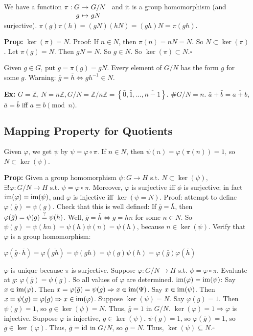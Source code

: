 \documentclass[10pt,letterpaper]{article}
\newcommand{\n}{\hfill\break}
\newcommand{\hangblock}[2]{\par\noindent\settowidth{\hangindent}{\textbf{#1: }}\textbf{#1: }\!\!\!#2}
\newcommand{\prop}[1]{\hangblock{Prop}{#1}}
\newcommand{\ex}[1]{\hangblock{Ex}{#1}}
\newcommand{\proven}{\;$\square$\n}
\newcommand{\ptxt}[1]{\textrm{\textnormal{#1}}}
\newcommand{\inlineeq}[1]{\centerline{$\displaystyle #1$}}
\newcommand{\set}[1]{\left\{#1\right\}}
\newcommand{\integers}{\mathbb{Z}}
\newcommand{\Z}{\integers}
\newcommand{\inv}{^{-1}}
\newcommand{\of}{\circ}
\newcommand{\map}[4]{\!\!\!\begin{array}[t]{rcl}#1 & \!\!\!\!\to & \!\!\!\!#2\\ #3 & \!\!\!\!\mapsto & \!\!\!\!#4\end{array}}
\newcommand{\im}{\textrm{\textnormal{im}}}
\newcommand{\id}{\ptxt{id}}
\newcommand{\st}{s.t.}
\newcommand{\unique}{!}
\begin{document}
\par\noindent
We have a function $\map{\pi:G}{G/N}{g}{gN}$ and it is a group homomorphism (and surjective).\n
$\pi(g)\pi(h)=(gN)(hN)=(gh)N=\pi(gh)$.\n

\prop{
	$\ker(\pi)=N$.\n
	Proof: If $n\in{}N$, then $\pi(n)=nN=N$. So $N\subset\ker(\pi)$.\n
	Let $\pi(g)=N$. Then $gN=N$. So $g\in{}N$. So $\ker(\pi)\subset{}N$.\proven
}

\par\noindent
Given $g\in{}G$, put $\bar{g}=\pi(g)=gN$. Every element of $G/N$ has the form $\bar{g}$ for some $g$.\n
Warning: $\bar{g}=\bar{h}\Leftrightarrow{}gh\inv\in{}N$.\n

\ex{
	$G=\Z$, $N=n\Z,G/N=\Z/n\Z=\set{\bar{0},\bar{1},\ldots,\overline{n-1}}$.\n
	$\#G/N=n$. $\bar{a}+\bar{b}=\overline{a+b}$, $\bar{a}=\bar{b}$ iff $a\equiv{}b\pmod{n}$.\n
}

\subsection*{Mapping Property for Quotients}

Given $\varphi$, we get $\psi$ by $\psi=\varphi\of\pi$. If $n\in{}N$, then $\psi(n)=\varphi(\pi(n))=1$, so $N\subset\ker(\psi)$.\n

\prop{
	Given a group homomorphism $\psi:G\to{}H$ \st{} $N\subset\ker(\psi)$, $\exists\unique\varphi:G/N\to{}H$ \st{} $\psi=\varphi\of\pi$. Moreover, $\varphi$ is surjective iff $\phi$ is surjective;\n
	in fact $\im(\varphi)=\im(\psi)$, and $\varphi$ is injective iff $\ker(\psi=N)$.\n
	Proof: attempt to define $\varphi(\bar{g})=\psi(g)$. Check that this is well defined:\n
	If $\bar{g}=\bar{h}$, then $\varphi(\bar{g})=\psi(g)\overset{\ptxt{?}}{=}\psi(h)$. Well, $\bar{g}=\bar{h}\Leftrightarrow{}g=hn$ for some $n\in{}N$. So\n
	$\psi(g)=\psi(hn)=\psi(h)\psi(n)=\psi(h)$, because $n\in\ker(\psi)$.\n
	Verify that $\varphi$ is a group homomorphism:\n
	\inlineeq{
		\varphi(\bar{g}\cdot\bar{h})=\varphi(\overline{gh})=\psi(gh)=\psi(g)\psi(h)=\varphi(\bar{g})\varphi(\bar{h})
	}
	$\varphi$ is unique because $\pi$ is surjective. Suppose $\varphi:G/N\to{}H$ \st{} $\psi=\varphi\of\pi$. Evaluate at $g$: $\varphi(\bar{g})=\psi(g)$. So all values of $\varphi$ are determined.\n
	\n
	$\im(\varphi)=\im(\psi)$:\n
	Say $x\in\im(\varphi)$. Then $x=\varphi(\bar{g})=\psi(g)\Rightarrow{}x\in\im(\Psi)$.\n
	Say $x\in\im(\psi)$. Then $x=\psi(g)=\varphi(\bar{g})\Rightarrow{}x\in\im(\varphi)$.\n
	\n
	Suppose $\ker(\psi)=N$. Say $\varphi(\bar{g})=1$. Then $\psi(g)=1$, so $g\in\ker(\psi)=N$. Thus, $\bar{g}=1$ in $G/N$. $\ker(\varphi)=1\Rightarrow\varphi$ is injective.\n
	\n
	Suppose $\varphi$ is injective, $g\in\ker(\psi)$. $\psi(g)=1$, so $\varphi(\bar{g})=1$, so $\bar{g}\in\ker(\varphi)$. Thus, $\bar{g}=\id$ in $G/N$, so $\bar{g}=N$. Thus, $\ker(\psi)\subseteq{}N$.\proven
}
\end{document}
